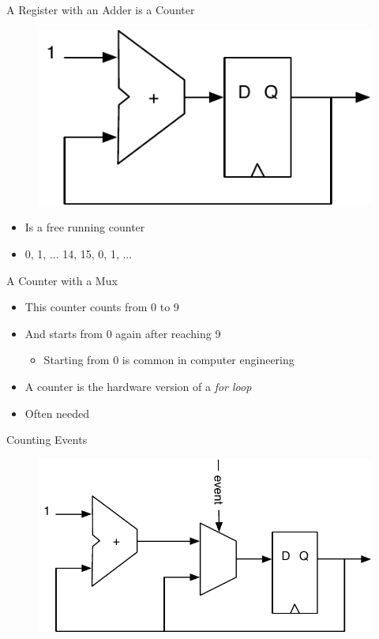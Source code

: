 \begin{frame}[fragile]{A Register with an Adder is a Counter}
\begin{figure}
  \includegraphics[scale=\scale]{../figures/counter}
\end{figure}
\begin{itemize}
\item Is a free running counter
\item 0, 1, ... 14, 15, 0, 1, ...
\end{itemize}
\end{frame}


\begin{frame}[fragile]{A Counter with a Mux}
\begin{itemize}
\item This counter counts from 0 to 9
\item And starts from 0 again after reaching 9
\begin{itemize}
\item Starting from 0 is common in computer engineering
\end{itemize}
\item A counter is the hardware version of a \emph{for loop}
\item Often needed
\end{itemize}
\end{frame}

\begin{frame}[fragile]{Counting Events}
\begin{figure}
  \includegraphics[scale=\scale]{../figures/event-counter}
\end{figure}
\end{frame}


